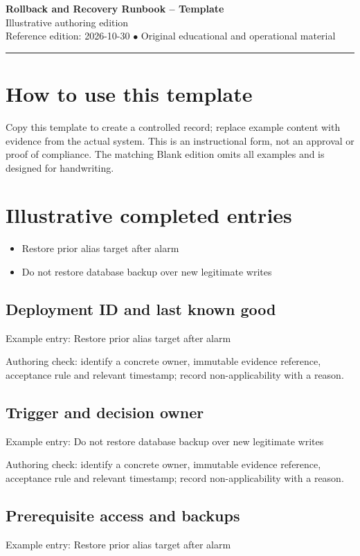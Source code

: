 \documentclass[10pt,letterpaper]{article}
\begin{document}
\begin{center}
{\LARGE\bfseries\color{cdblue}Rollback and Recovery Runbook -- Template}\\[7pt]
{\large Illustrative authoring edition}\\[6pt]
{\small Reference edition: 2026-10-30 $\bullet$ Original educational and operational material}
\end{center}
\noindent\color{cdblue}\rule{\linewidth}{1.2pt}\color{black}
\vspace{0.4em}
\section{How to use this template}
Copy this template to create a controlled record; replace example content with evidence from the actual system. This is an instructional form, not an approval or proof of compliance. The matching Blank edition omits all examples and is designed for handwriting.


\section{Illustrative completed entries}
\begin{itemize}
\item Restore prior alias target after alarm
\item Do not restore database backup over new legitimate writes
\end{itemize}

\subsection{Deployment ID and last known good}
Example entry: Restore prior alias target after alarm

Authoring check: identify a concrete owner, immutable evidence reference, acceptance rule and relevant timestamp; record non-applicability with a reason.


\subsection{Trigger and decision owner}
Example entry: Do not restore database backup over new legitimate writes

Authoring check: identify a concrete owner, immutable evidence reference, acceptance rule and relevant timestamp; record non-applicability with a reason.


\subsection{Prerequisite access and backups}
Example entry: Restore prior alias target after alarm
\end{document}

